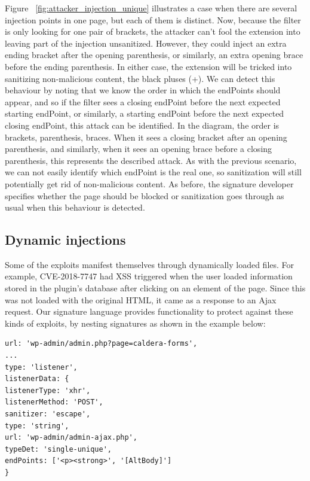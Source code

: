 Figure ~\ref{fig:attacker_injection_unique} illustrates a case when there are several injection points in one page, but each of them is distinct. Now, because the filter is only looking for one pair of brackets, the attacker can't fool the extension into leaving part of the injection unsanitized. However, they could inject an extra ending bracket after the opening parenthesis, or similarly, an extra opening brace before the ending parenthesis. In either case, the extension will be tricked into sanitizing non-malicious content, the black pluses (+). We can detect this behaviour by noting that we know the order in which the endPoints should appear, and so if the filter sees a closing endPoint before the next expected starting endPoint, or similarly, a starting endPoint before the next expected closing endPoint, this attack can be identified. In the diagram, the order is brackets, parenthesis, braces. When it sees a closing bracket after an opening parenthesis, and similarly, when it sees an opening brace before a closing parenthesis, this represents the described attack. As with the previous scenario, we can not easily identify which endPoint is the real one, so sanitization will still potentially get rid of non-malicious content. As before, the signature developer specifies whether the page should be blocked or sanitization goes through as usual when this behaviour is detected.

\subsection{Dynamic injections} \label{dynamic_injections}
Some of the exploits manifest themselves through dynamically loaded files. For example, CVE-2018-7747 had XSS triggered when the user loaded information stored in the plugin's database after clicking on an element of the page. Since this was not loaded with the original HTML, it came as a response to an Ajax request. Our signature language provides functionality to protect against these kinds of exploits, by nesting signatures as shown in the example below:

\lstset{basicstyle=\small}
\begin{lstlisting}[breaklines=true,caption={A signature for a dynamic request},label={lst:dynamic_signature}]
url: 'wp-admin/admin.php?page=caldera-forms',
...
type: 'listener',
listenerData: {
listenerType: 'xhr',
listenerMethod: 'POST',
sanitizer: 'escape',
type: 'string',
url: 'wp-admin/admin-ajax.php',
typeDet: 'single-unique',
endPoints: ['<p><strong>', '[AltBody]']
}
\end{lstlisting}

